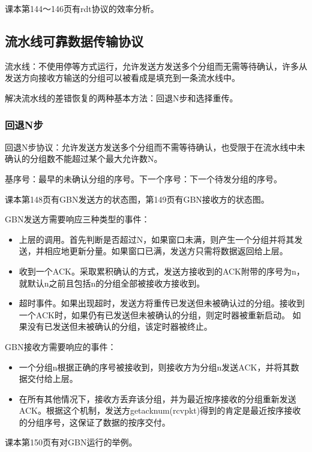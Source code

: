 \documentclass[a4paper,left=2.5cm,right=2.5cm,11pt]{article}
\begin{document}
	课本第144～146页有rdt协议的效率分析。

\subsection{流水线可靠数据传输协议}
	流水线：不使用停等方式运行，允许发送方发送多个分组而无需等待确认，许多从发送方向接收方输送的分组可以被看成是填充到一条流水线中。\par

	解决流水线的差错恢复的两种基本方法：回退N步和选择重传。

\subsubsection{回退N步}
	回退N步协议：允许发送方发送多个分组而不需等待确认，也受限于在流水线中未确认的分组数不能超过某个最大允许数N。\par

	基序号：最早的未确认分组的序号。下一个序号：下一个待发分组的序号。\par

	课本第148页有GBN发送方的状态图，第149页有GBN接收方的状态图。\par

	GBN发送方需要响应三种类型的事件：
	\begin{itemize}
		\item 上层的调用。首先判断是否超过N，如果窗口未满，则产生一个分组并将其发送，并相应地更新分量。如果窗口已满，发送方只需将数据返回给上层。
		\item 收到一个ACK。采取累积确认的方式，发送方接收到的ACK附带的序号为n，就默认n之前且包括n的分组全部被接收方接收到。
		\item 超时事件。如果出现超时，发送方将重传已发送但未被确认过的分组。接收到一个ACK时，如果仍有已发送但未被确认的分组，则定时器被重新启动。
			  如果没有已发送但未被确认的分组，该定时器被终止。
	\end{itemize}

	GBN接收方需要响应的事件：
	\begin{itemize}
		\item 一个分组n根据正确的序号被接收到，则接收方为分组n发送ACK，并将其数据交付给上层。
		\item 在所有其他情况下，接收方丢弃该分组，并为最近按序接收的分组重新发送ACK。根据这个机制，发送方getacknum(rcvpkt)得到的肯定是最近按序接收的分组序号，这保证了数据的按序交付。
	\end{itemize}

	课本第150页有对GBN运行的举例。\par
\end{document}
